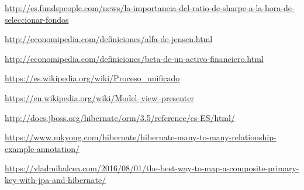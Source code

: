 \documentclass[12pt, a4paper]{book}
\begin{document}
\begin{thebibliography}{10}
	\newline
	\href{http://es.fundspeople.com/news/la-importancia-del-ratio-de-sharpe-a-la-hora-de-seleccionar-fondos}{http://es.fundspeople.com/news/la-importancia-del-ratio-de-sharpe-a-la-hora-de-seleccionar-fondos}
	
	\bibitem[Economipedia]{}
	\newline
	\href{http://economipedia.com/definiciones/alfa-de-jensen.html}{http://economipedia.com/definiciones/alfa-de-jensen.html}
	
	\bibitem[Economipedia]{}
	\newline
	\href{http://economipedia.com/definiciones/beta-de-un-activo-financiero.html}{http://economipedia.com/definiciones/beta-de-un-activo-financiero.html}
	
	\bibitem[Wikipedia]{}
	\newline
	\href{https://es.wikipedia.org/wiki/Proceso\_unificado}{https://es.wikipedia.org/wiki/Proceso\_unificado}
	
	\bibitem[Wikipedia]{}
	\newline
	\href{https://en.wikipedia.org/wiki/Model–view–presenter}{https://en.wikipedia.org/wiki/Model–view–presenter}
	
	\bibitem[Jboss]{}
	\newline
	\href{http://docs.jboss.org/hibernate/orm/3.5/reference/es-ES/html/}{http://docs.jboss.org/hibernate/orm/3.5/reference/es-ES/html/}
	
	\newpage
	
	\bibitem[Mkyong]{}
	\newline
	\href{https://www.mkyong.com/hibernate/hibernate-many-to-many-relationship-example-annotation/}{https://www.mkyong.com/hibernate/hibernate-many-to-many-relationship-example-annotation/}
	
	
	
	\bibitem[Vladmihalcea]{}
	\newline
	\href{https://vladmihalcea.com/2016/08/01/the-best-way-to-map-a-composite-primary-key-with-jpa-and-hibernate/}{https://vladmihalcea.com/2016/08/01/the-best-way-to-map-a-composite-primary-key-with-jpa-and-hibernate/}
	

\end{thebibliography}
\end{document}
